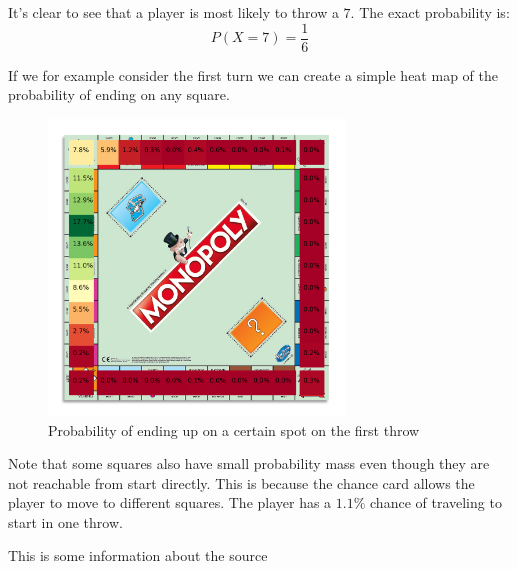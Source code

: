 \documentclass{article}
\begin{document}
It's clear to see that a player is most likely to throw a $7$. The exact probability is:
$$P(X = 7) = \frac{1}{6}$$

If we for example consider the first turn we can create a simple heat map of the probability of ending on any square.


\begin{figure}[h]
\centering
\includegraphics[width = 0.7\textwidth]{firstThrow.png}
\caption{Probability of ending up on a certain spot on the first throw}
\end{figure}

Note that some squares also have small probability mass even though they are not reachable from start directly. This is because the chance card allows the player to move to different squares. The player has a $1.1\%$ chance of traveling to start in one throw.

\begin{thebibliography}{9}
 This is some information about the source
\end{thebibliography}
\end{document}
